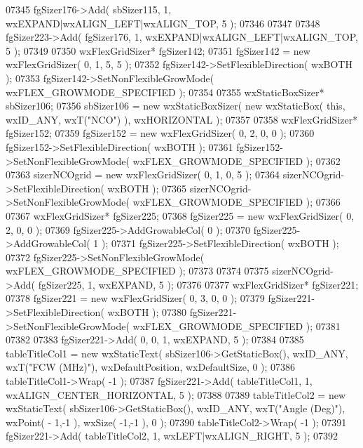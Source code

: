 \begin{DoxyCode}
07345     fgSizer176->Add( sbSizer115, 1, wxEXPAND|wxALIGN\_LEFT|wxALIGN\_TOP, 5 );
07346     
07347     
07348     fgSizer223->Add( fgSizer176, 1, wxEXPAND|wxALIGN\_LEFT|wxALIGN\_TOP, 5 );
07349     
07350     wxFlexGridSizer* fgSizer142;
07351     fgSizer142 = \textcolor{keyword}{new} wxFlexGridSizer( 0, 1, 5, 5 );
07352     fgSizer142->SetFlexibleDirection( wxBOTH );
07353     fgSizer142->SetNonFlexibleGrowMode( wxFLEX\_GROWMODE\_SPECIFIED );
07354     
07355     wxStaticBoxSizer* sbSizer106;
07356     sbSizer106 = \textcolor{keyword}{new} wxStaticBoxSizer( \textcolor{keyword}{new} wxStaticBox( \textcolor{keyword}{this}, wxID\_ANY, wxT(\textcolor{stringliteral}{"NCO"}) ), wxHORIZONTAL );
07357     
07358     wxFlexGridSizer* fgSizer152;
07359     fgSizer152 = \textcolor{keyword}{new} wxFlexGridSizer( 0, 2, 0, 0 );
07360     fgSizer152->SetFlexibleDirection( wxBOTH );
07361     fgSizer152->SetNonFlexibleGrowMode( wxFLEX\_GROWMODE\_SPECIFIED );
07362     
07363     sizerNCOgrid = \textcolor{keyword}{new} wxFlexGridSizer( 0, 1, 0, 5 );
07364     sizerNCOgrid->SetFlexibleDirection( wxBOTH );
07365     sizerNCOgrid->SetNonFlexibleGrowMode( wxFLEX\_GROWMODE\_SPECIFIED );
07366     
07367     wxFlexGridSizer* fgSizer225;
07368     fgSizer225 = \textcolor{keyword}{new} wxFlexGridSizer( 0, 2, 0, 0 );
07369     fgSizer225->AddGrowableCol( 0 );
07370     fgSizer225->AddGrowableCol( 1 );
07371     fgSizer225->SetFlexibleDirection( wxBOTH );
07372     fgSizer225->SetNonFlexibleGrowMode( wxFLEX\_GROWMODE\_SPECIFIED );
07373     
07374     
07375     sizerNCOgrid->Add( fgSizer225, 1, wxEXPAND, 5 );
07376     
07377     wxFlexGridSizer* fgSizer221;
07378     fgSizer221 = \textcolor{keyword}{new} wxFlexGridSizer( 0, 3, 0, 0 );
07379     fgSizer221->SetFlexibleDirection( wxBOTH );
07380     fgSizer221->SetNonFlexibleGrowMode( wxFLEX\_GROWMODE\_SPECIFIED );
07381     
07382     
07383     fgSizer221->Add( 0, 0, 1, wxEXPAND, 5 );
07384     
07385     tableTitleCol1 = \textcolor{keyword}{new} wxStaticText( sbSizer106->GetStaticBox(), wxID\_ANY, wxT(\textcolor{stringliteral}{"FCW (MHz)"}), 
      wxDefaultPosition, wxDefaultSize, 0 );
07386     tableTitleCol1->Wrap( -1 );
07387     fgSizer221->Add( tableTitleCol1, 1, wxALIGN\_CENTER\_HORIZONTAL, 5 );
07388     
07389     tableTitleCol2 = \textcolor{keyword}{new} wxStaticText( sbSizer106->GetStaticBox(), wxID\_ANY, wxT(\textcolor{stringliteral}{"Angle (Deg)"}), wxPoint( -
      1,-1 ), wxSize( -1,-1 ), 0 );
07390     tableTitleCol2->Wrap( -1 );
07391     fgSizer221->Add( tableTitleCol2, 1, wxLEFT|wxALIGN\_RIGHT, 5 );
07392     

\end{DoxyCode}
